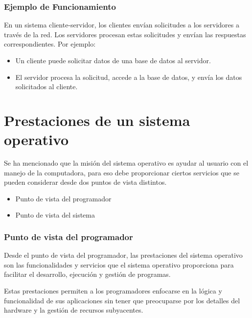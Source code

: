 \subsubsection*{Ejemplo de Funcionamiento}

En un sistema cliente-servidor, los clientes envían solicitudes a los servidores a través de la red. Los servidores procesan estas solicitudes y envían las respuestas correspondientes. Por ejemplo:
\begin{itemize}
	\item Un cliente puede solicitar datos de una base de datos al servidor.
	\item El servidor procesa la solicitud, accede a la base de datos, y envía los datos solicitados al cliente.
\end{itemize}

\section{Prestaciones de un sistema operativo}
Se ha mencionado que la misión del sistema operativo es ayudar al usuario con el manejo de la computadora, para eso debe proporcionar ciertos servicios que se pueden considerar desde dos puntos de vista distintos.

\begin{tcolorbox}
\begin{itemize}
	\item Punto de vista del programador
	\item Punto de vista del sistema
\end{itemize}

\end{tcolorbox}

\subsubsection{Punto de vista del programador}
Desde el punto de vista del programador, las prestaciones del sistema operativo son las funcionalidades y servicios que el sistema operativo proporciona para facilitar el desarrollo, ejecución y gestión de programas. 

Estas prestaciones permiten a los programadores enfocarse en la lógica y funcionalidad de sus aplicaciones sin tener que preocuparse por los detalles del hardware y la gestión de recursos subyacentes.

